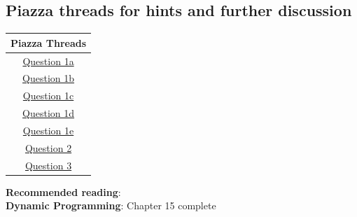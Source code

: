 \documentclass[12pt]{article}
\begin{document}
\hrulefill
\pagebreak

\subsection*{Piazza threads for hints and further discussion}
\begin{center}
    \begin{tabular}{|c|}
    \hline
    Piazza Threads \\ [0.5ex] 
    \hline \hline 
     \href{https://piazza.com/class/ka2roz7rb9m3j4?cid=50}{Question 1a}\\
     \href{https://piazza.com/class/ka2roz7rb9m3j4?cid=51}{Question 1b}\\
     \href{https://piazza.com/class/ka2roz7rb9m3j4?cid=52}{Question 1c}\\
     \href{https://piazza.com/class/ka2roz7rb9m3j4?cid=53}{Question 1d}\\
     \href{https://piazza.com/class/ka2roz7rb9m3j4?cid=54}{Question 1e}\\
     \href{https://piazza.com/class/ka2roz7rb9m3j4?cid=55}{Question 2}\\
     \href{https://piazza.com/class/ka2roz7rb9m3j4?cid=56}{Question 3}\\
    \hline
    \end{tabular}
\end{center}

\textbf{Recommended reading}: \\
\textbf{Dynamic Programming}: Chapter 15 complete 
\pagebreak
\end{document}
